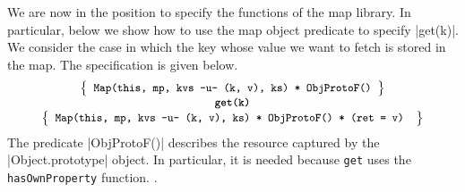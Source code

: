 

We are now in the position to specify the functions of the map library. In particular, below we show how to use 
the map object predicate to specify \jsinline|get(k)|.  
%
We consider the case in which the key whose value we  want to fetch is stored in the 
map.  The specification is given below. 
%
\begin{displaymath} 
{\footnotesize
\begin{array}{c}
\left\{ {\begin{array}{c}
 \text{\texttt{Map(this, mp, kvs -u- (k, v), ks) * ObjProtoF()}} \\ 
\end{array}} \right\} \\
%
\text{\bfseries \texttt{get(k)}} \\[0.2mm]
%
\left\{ {\begin{array}{c}
 \text{\texttt{Map(this, mp, kvs -u- (k, v), ks) * ObjProtoF() * (ret = v) }} \\
\end{array}} \right\}
\end{array}
} 
\end{displaymath}
%
The predicate \jsinline|ObjProtoF()| describes the resource captured by the \jsinline|Object.prototype| object. 
In particular, it is needed because \texttt{get} uses the \texttt{hasOwnProperty} function. .
